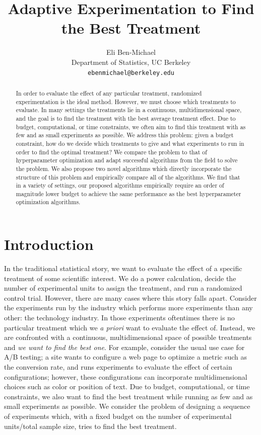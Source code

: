 \documentclass[11pt]{article}
\title{Adaptive Experimentation to Find the Best Treatment}
\author{
  Eli Ben-Michael\\
  Department of Statistics, UC Berkeley\\
  \texttt{ebenmichael@berkeley.edu}}
\begin{document}
\maketitle
\vspace{-1em}
\begin{abstract}
In order to evaluate the effect of any particular treatment, randomized experimentation is the ideal method. However, we must choose which treatments to evaluate. In many settings the treatments lie in a continuous, multidimensional space, and the goal is to find the treatment with the best average treatment effect. Due to budget, computational, or time constraints, we often aim to find this treatment with as few and as small experiments as possible. We address this problem: given a budget constraint, how do we decide which treatments to give and what experiments to run in order to find the optimal treatment? We compare the problem to that of hyperparameter optimization and adapt successful algorithms from the field to solve the problem. We also propose two novel algorithms which directly incorporate the structure of this problem and empirically compare all of the algorithms. We find that in a variety of settings, our proposed algorithms empirically require an order of magnitude lower budget to achieve the same performance as the best hyperparameter optimization algorithms.
\end{abstract}



\section{Introduction}
In the traditional statistical story, we want to evaluate the effect of a specific treatment of some scientific interest. We do a power calculation, decide the number of experimental units to assign the treatment, and run a randomized control trial. However, there are many cases where this story falls apart. Consider the experiments run by the industry which performs more experiments than any other: the technology industry. In those experiments oftentimes there is no particular treatment which we {\it a priori} want to evaluate the effect of. Instead, we are confronted with a continuous, multidimensional space of possible treatments and {\it we want to find the best one}. For example, consider the usual use case for A/B testing; a site wants to configure a web page to optimize a metric such as the conversion rate, and runs experiments to evaluate the effect of certain configurations; however, these configurations can incorporate multidimensional choices such as color or position of text. Due to budget, computational, or time constraints, we also want to find the best treatment while running as few and as small experiments as possible. We consider the problem of designing a sequence of experiments which, with a fixed budget on the number of experimental units/total sample size, tries to find the best treatment.
\end{document}
